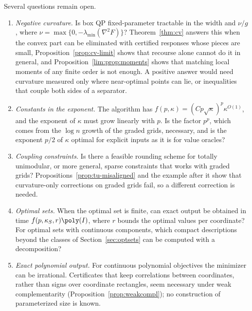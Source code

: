 Several questions remain open.
\begin{enumerate}[label=(\arabic*)]
\item \emph{Negative curvature.} Is box QP fixed-parameter tractable in the
width and $\nu/g$, where $\nu=\max\{0,-\lambda_{\min}(\nabla^2F)\}$?
Theorem~\ref{thm:cv} answers this when the convex part can be eliminated with
certified responses whose pieces are small, Proposition~\ref{prop:cv-limit}
shows that recourse alone cannot do it in general, and
Proposition~\ref{lim:prop:moments} shows that matching local moments of any
finite order is not enough. A positive answer would need curvature measured
only where near-optimal points can lie, or inequalities that couple both sides
of a separator.
\item \emph{Constants in the exponent.} The algorithm has
$f(p,\kappa)=(Cp\sqrt\kappa)^p\kappa^{O(1)}$, and the exponent of $\kappa$ must grow
linearly with $p$. Is the factor $p^p$, which comes from the $\log n$ growth of
the graded grids, necessary, and is the exponent $p/2$ of $\kappa$ optimal for
explicit inputs as it is for value oracles?
\item \emph{Coupling constraints.} Is there a feasible rounding scheme for
totally unimodular, or more general, sparse constraints that works with graded
grids? Propositions~\ref{prop:tu-misaligned} and the example after it show that
curvature-only corrections on graded grids fail, so a different correction is
needed.
\item \emph{Optimal sets.} When the optimal set is finite, can exact output be
obtained in time $f(p,\kappa_S,r)\poly(I)$, where $r$ bounds the optimal values per
coordinate? For optimal sets with continuous components, which compact
descriptions beyond the classes of Section~\ref{sec:optsets} can be computed
with a decomposition?
\item \emph{Exact polynomial output.} For continuous polynomial objectives the
minimizer can be irrational. Certificates that keep correlations between
coordinates, rather than signs over coordinate rectangles, seem necessary
under weak complementarity (Proposition~\ref{prop:weakcompl}); no construction of
parameterized size is known.
\end{enumerate}

